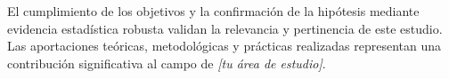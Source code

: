 El cumplimiento de los objetivos y la confirmación de la hipótesis mediante evidencia estadística robusta validan la relevancia y pertinencia de este estudio. Las aportaciones teóricas, metodológicas y prácticas realizadas representan una contribución significativa al campo de \textit{[tu área de estudio]}.

%
%

